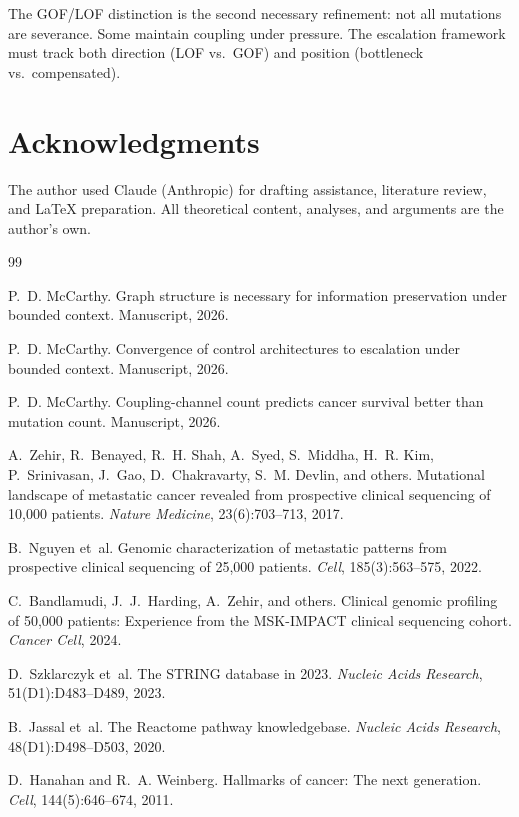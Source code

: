 \documentclass[11pt]{article}
\begin{document}
The GOF/LOF distinction is the second necessary refinement: not all
mutations are severance. Some maintain coupling under pressure.
The escalation framework must track both direction (LOF vs.\ GOF)
and position (bottleneck vs.\ compensated).

\section*{Acknowledgments}

The author used Claude (Anthropic) for drafting assistance,
literature review, and \LaTeX{} preparation. All theoretical
content, analyses, and arguments are the author's own.


\begin{thebibliography}{99}

P.~D. McCarthy.
\newblock Graph structure is necessary for information preservation under
  bounded context.
\newblock Manuscript, 2026.

P.~D. McCarthy.
\newblock Convergence of control architectures to escalation under bounded
  context.
\newblock Manuscript, 2026.

P.~D. McCarthy.
\newblock Coupling-channel count predicts cancer survival better than mutation
  count.
\newblock Manuscript, 2026.

A.~Zehir, R.~Benayed, R.~H. Shah, A.~Syed, S.~Middha,
  H.~R. Kim, P.~Srinivasan, J.~Gao, D.~Chakravarty,
  S.~M. Devlin, and others.
\newblock Mutational landscape of metastatic cancer revealed from
  prospective clinical sequencing of 10,000 patients.
\newblock \emph{Nature Medicine}, 23(6):703--713, 2017.

B.~Nguyen et~al.
\newblock Genomic characterization of metastatic patterns from
  prospective clinical sequencing of 25,000 patients.
\newblock \emph{Cell}, 185(3):563--575, 2022.

C.~Bandlamudi, J.~J.~Harding, A.~Zehir, and others.
\newblock Clinical genomic profiling of 50,000 patients:
  Experience from the {MSK-IMPACT} clinical sequencing cohort.
\newblock \emph{Cancer Cell}, 2024.

D.~Szklarczyk et~al.
\newblock The {STRING} database in 2023.
\newblock \emph{Nucleic Acids Research}, 51(D1):D483--D489, 2023.

B.~Jassal et~al.
\newblock The {R}eactome pathway knowledgebase.
\newblock \emph{Nucleic Acids Research}, 48(D1):D498--D503, 2020.

D.~Hanahan and R.~A. Weinberg.
\newblock Hallmarks of cancer: The next generation.
\newblock \emph{Cell}, 144(5):646--674, 2011.

\end{thebibliography}
\end{document}
